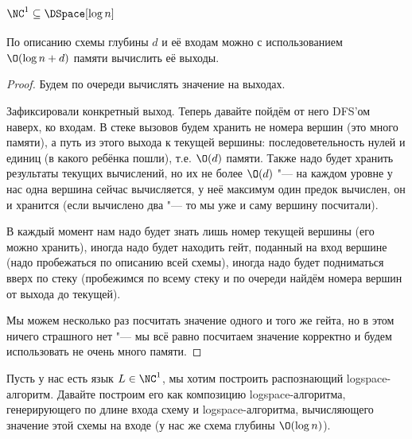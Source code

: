 \subsection[{NC1 <= DSpace[log n]}]{$\NC^1 \subseteq \DSpace[\log n]$}
	\begin{lemma}
		По описанию схемы глубины $d$ и её входам можно с использованием $\O(\log n + d)$ памяти вычислить её выходы.
	\end{lemma}
	\begin{proof}
		Будем по очереди вычислять значение на выходах.

		Зафиксировали конкретный выход.
		Теперь давайте пойдём от него DFS'ом наверх, ко входам.
		В стеке вызовов будем хранить не номера вершин (это много памяти), а путь из этого выхода к текущей вершины: последоветельность
		нулей и единиц (в какого ребёнка пошли), т.е. $\O(d)$ памяти.
		Также надо будет хранить результаты текущих вычислений, но их не более $\O(d)$ "--- на каждом уровне у нас одна вершина сейчас вычисляется,
		у неё максимум один предок вычислен, он и хранится (если вычислено два "--- то мы уже и саму вершину посчитали).

		В каждый момент нам надо будет знать лишь номер текущей вершины (его можно хранить), иногда надо будет находить гейт, поданный на вход
		вершине (надо пробежаться по описанию всей схемы), иногда надо будет подниматься вверх по стеку (пробежимся по всему стеку и по очереди
		найдём номера вершин от выхода до текущей).

		Мы можем несколько раз посчитать значение одного и того же гейта, но в этом ничего страшного нет "--- мы всё равно посчитаем значение корректно
		и будем использовать не очень много памяти.
	\end{proof}

	Пусть у нас есть язык $L \in \NC^1$, мы хотим построить распознающий logspace-алгоритм.
	Давайте построим его как композицию logspace-алгоритма, генерирующего по длине входа схему
	и logspace-алгоритма, вычисляющего значение этой схемы на входе (у нас же схема глубины $\O(\log n)$).
